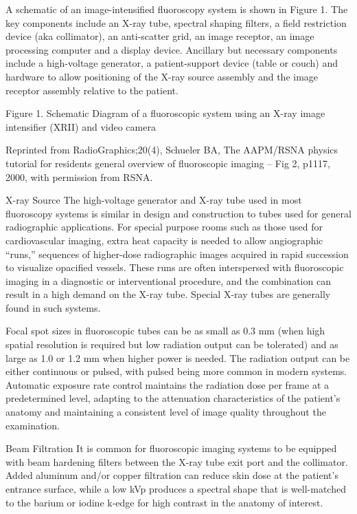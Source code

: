 \documentclass{assignment}
\begin{document}
\begin{problem}
{A schematic of an image-intensified fluoroscopy system is shown in Figure 1. The key components include an X-ray tube, spectral shaping filters, a field restriction device (aka collimator), an anti-scatter grid, an image receptor, an image processing computer and a display device. Ancillary but necessary components include a high-voltage generator, a patient-support device (table or couch) and hardware to allow positioning of the X-ray source assembly and the image receptor assembly relative to the patient.

Figure 1. Schematic Diagram of a fluoroscopic system using an X-ray image intensifier (XRII) and video camera


Reprinted from RadioGraphics;20(4), Schueler BA, The AAPM/RSNA physics tutorial for residents general overview of fluoroscopic imaging – Fig 2, p1117, 2000, with permission from RSNA. 

X-ray Source
The high-voltage generator and X-ray tube used in most fluoroscopy systems is similar in design and construction to tubes used for general radiographic applications. For special purpose rooms such as those used for cardiovascular imaging, extra heat capacity is needed to allow angiographic “runs,” sequences of higher-dose radiographic images acquired in rapid succession to visualize opacified vessels. These runs are often interspersed with fluoroscopic imaging in a diagnostic or interventional procedure, and the combination can result in a high demand on the X-ray tube. Special X-ray tubes are generally found in such systems.

Focal spot sizes in fluoroscopic tubes can be as small as 0.3 mm (when high spatial resolution is required but low radiation output can be tolerated) and as large as 1.0 or 1.2 mm when higher power is needed. The radiation output can be either continuous or pulsed, with pulsed being more common in modern systems. Automatic exposure rate control maintains the radiation dose per frame at a predetermined level, adapting to the attenuation characteristics of the patient’s anatomy and maintaining a consistent level of image quality throughout the examination.

Beam Filtration
It is common for fluoroscopic imaging systems to be equipped with beam hardening filters between the X-ray tube exit port and the collimator. Added aluminum and/or copper filtration can reduce skin dose at the patient’s entrance surface, while a low kVp produces a spectral shape that is well-matched to the barium or iodine k-edge for high contrast in the anatomy of interest.

}
\end{problem}
\end{document}
